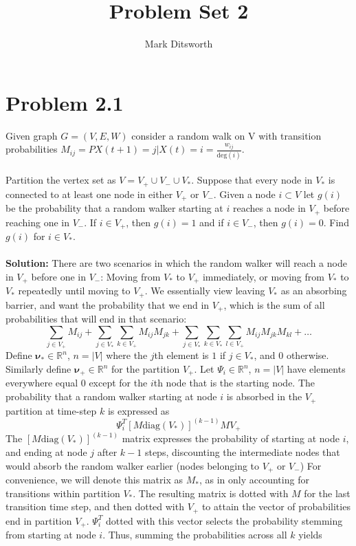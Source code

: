 \documentclass{amsart}
\title{Problem Set 2}
\author{Mark Ditsworth}
\begin{document}
	\maketitle
	\section{Problem 2.1}
	Given graph $G=(V,E,W)$ consider a random walk on V with transition probabilities $M_{ij} = P{X(t+1)=j | X(t)=i} = \frac{w_{ij}}{\text{deg}(i)}$.
	\\\\
	Partition the vertex set as $V = V_+ \cup V_- \cup V_*$. Suppose that every node in $V_*$ is connected to at least one node in either $V_+$ or $V_-$. Given a node $i \subset V$ let $g(i)$ be the probability that a random walker starting at $i$ reaches a node in $V_+$ before reaching one in $V_-$. If $i \in V_+$, then $g(i)=1$ and if $i \in V_-$, then $g(i)=0$. Find $g(i)$ for $i \in V_*$.
	\\\\
	\textbf{Solution:}
	There are two scenarios in which the random walker will reach a node in $V_+$ before one in $V_-$: Moving from $V_*$ to $V_+$ immediately, or moving from $V_*$ to $V_*$ repeatedly until moving to $V_+$. We essentially view leaving $V_*$ as an absorbing barrier, and want the probability that we end in $V_+$, which is the sum of all probabilities that will end in that scenario:
	\[
	\sum_{j \in V_+}M_{ij} + \sum_{j \in V_*}\sum_{k \in V_+}M_{ij}M_{jk} + \sum_{j \in V_*}\sum_{k \in V_*}\sum_{l \in V_+}M_{ij}M_{jk}M_{kl} + \dots
	\]
	Define $\mathbf{\nu_*} \in \mathbb{R}^n$, $n=|V|$ where the $j$th element is $1$ if $j \in V_*$, and $0$ otherwise. Similarly define $\mathbf{\nu_+} \in \mathbb{R}^n$ for the partition $V_+$. Let $\Psi_i \in \mathbb{R}^n$, $n=|V|$ have elements everywhere equal 0 except for the $i$th node that is the starting node. The probability that a random walker starting at node $i$ is absorbed in the $V_+$ partition at time-step $k$ is expressed as
	\[
	\Psi_i^T \left[ M\text{diag}\left(V_*\right) \right]^{(k-1)} MV_+
	\]
	The $\left[ M\text{diag}\left(V_*\right) \right]^{(k-1)}$ matrix expresses the probability of starting at node $i$, and ending at node $j$ after $k-1$ steps, discounting the intermediate nodes that would absorb the random walker earlier (nodes belonging to $V_+$ or $V_-$) For convenience, we will denote this matrix as $M_*$, as in only accounting for transitions within partition $V_*$. The resulting matrix is dotted with $M$ for the last transition time step, and then dotted with $V_+$ to attain the vector of probabilities end in partition $V_+$. $\Psi_i^T$ dotted with this vector selects the probability stemming from starting at node $i$. Thus, summing the probabilities across all $k$ yields
\end{document}
